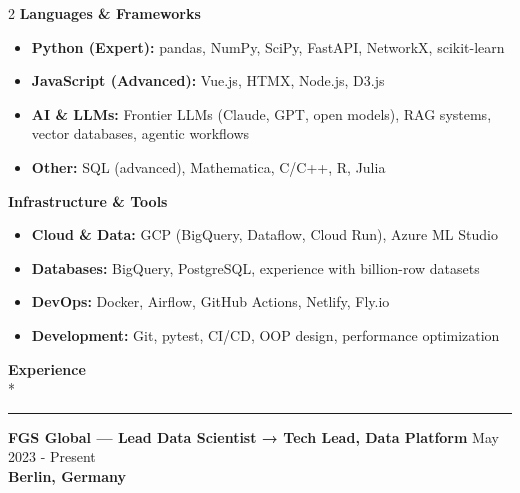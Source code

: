 \documentclass[11pt,a4paper]{article}
\newlength{\spacesm}    \setlength{\spacesm}{11pt}     %
\newlength{\spacexl}    \setlength{\spacexl}{38pt}     %
\newcommand{\bodytext}[1]{%
    {\fontsize{10pt}{14pt}\selectfont\color{charcoal} #1}%
}
\newcommand{\bodytextbold}[1]{%
    {\fontsize{10pt}{14pt}\selectfont\color{charcoal}\bfseries #1}%
}
\newcommand{\microtext}[1]{%
    {\fontsize{8pt}{11pt}\selectfont\color{mediumgray} #1}%
}
\newcommand{\sectiontitle}[1]{%
    \needspace{4\baselineskip}%
    \vspace{\spacexl}%
    {\fontsize{12pt}{14pt}\selectfont\color{navy}\bfseries #1}\\*%
    \vspace{1pt}%
    {\color{verdigris}\rule{20pt}{1pt}}%
    \vspace{0pt}%
}
\newcommand{\verdigrisbullet}{{\color{verdigris}$\bullet$}\space}
\newcommand{\jobduration}[1]{%
    {\fontspec{JetBrains Mono}\microtext{#1}}
}
\newcommand{\companyname}[1]{%
    {\color{darkgray}\bfseries #1}
}
\begin{document}
\setlength{\multicolsep}{0pt}
\begin{multicols}{2}
\raggedcolumns
\bodytextbold{Languages \& Frameworks}
\vspace{2pt}
\begin{itemize}[leftmargin=15pt,itemindent=0pt,labelwidth=10pt,labelsep=5pt,itemsep=1pt,parsep=0pt,topsep=0pt,partopsep=0pt]
    \item[\verdigrisbullet] \bodytext{\textbf{Python (Expert):} pandas, NumPy, SciPy, FastAPI, NetworkX, scikit-learn}
    \item[\verdigrisbullet] \bodytext{\textbf{JavaScript (Advanced):} Vue.js, HTMX, Node.js, D3.js}
    \item[\verdigrisbullet] \bodytext{\textbf{AI \& LLMs:} Frontier LLMs (Claude, GPT, open models), RAG systems, vector databases, agentic workflows}
    \item[\verdigrisbullet] \bodytext{\textbf{Other:} SQL (advanced), Mathematica, C/C++, R, Julia}
\end{itemize}

\columnbreak

\bodytextbold{Infrastructure \& Tools}
\vspace{2pt}
\begin{itemize}[leftmargin=15pt,itemindent=0pt,labelwidth=10pt,labelsep=5pt,itemsep=1pt,parsep=0pt,topsep=0pt,partopsep=0pt]
    \item[\verdigrisbullet] \bodytext{\textbf{Cloud \& Data:} GCP (BigQuery, Dataflow, Cloud Run), Azure ML Studio}
    \item[\verdigrisbullet] \bodytext{\textbf{Databases:} BigQuery, PostgreSQL, experience with billion-row datasets}
    \item[\verdigrisbullet] \bodytext{\textbf{DevOps:} Docker, Airflow, GitHub Actions, Netlify, Fly.io}
    \item[\verdigrisbullet] \bodytext{\textbf{Development:} Git, pytest, CI/CD, OOP design, performance optimization}
\end{itemize}
\end{multicols}

\sectiontitle{Experience}
\vspace{\spacesm}

\bodytext{\textbf{FGS Global — Lead Data Scientist → Tech Lead, Data Platform}} \hfill \jobduration{May 2023 - Present}\\
\companyname{Berlin, Germany}
\end{document}
